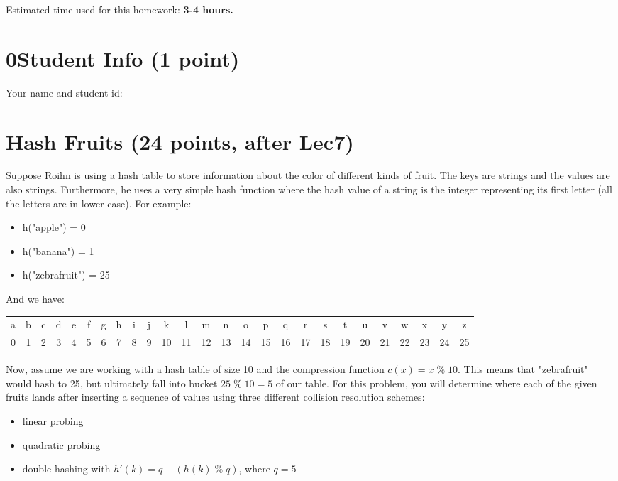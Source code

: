 \documentclass[11pt]{exam}
\begin{document}
Estimated time used for this homework: \textbf{3-4 hours.}

\newpage
\section*{0\quad Student Info (1 point)}
Your name and student id:
\begin{solution}
\end{solution}

\section{Hash Fruits (24 points, after Lec7)}
Suppose Roihn is using a hash table to store information about the color of different kinds of fruit. The keys are strings and the values are also strings. Furthermore, he uses a very simple hash function where the hash value of a string is the integer representing its first letter (all the letters are in lower case). For example:
\begin{itemize}
\item h("apple") = 0
\item h("banana") = 1
\item h("zebrafruit") = 25
\end{itemize}

And we have:
\begin{table}[H]
\centering
\setlength{\tabcolsep}{1mm}
\begin{tabular}{cccccccccccccccccccccccccc}
a&b&c&d&e&f&g&h&i&j&k&l&m&n&o&p&q&r&s&t&u&v&w&x&y&z\\
0&1&2&3&4&5&6&7&8&9&10&11&12&13&14&15&16&17&18&19&20&21&22&23&24&25
\end{tabular}
\end{table}
Now, assume we are working with a hash table of size 10 and the compression function $c(x) = x \;\%\; 10$. This means that "zebrafruit" would hash to 25, but ultimately fall into bucket $25 \;\%\; 10 = 5$ of our table. For this problem, you will determine where each of the given fruits lands after inserting a sequence of values using three different collision resolution schemes:

\begin{itemize}
\item linear probing
\item quadratic probing
\item double hashing with $h'(k) = q - (h(k) \;\%\; q)$, where $q=5$
\end{itemize}
\end{document}
